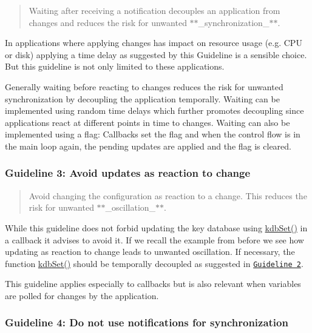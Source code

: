 \begin{quote}
Waiting after receiving a notification decouples an application from changes and reduces the risk for unwanted $\ast$$\ast$\+\_\+synchronization\+\_\+$\ast$$\ast$. \end{quote}


In applications where applying changes has impact on resource usage (e.\+g. C\+PU or disk) applying a time delay as suggested by this Guideline is a sensible choice. But this guideline is not only limited to these applications.

Generally waiting before reacting to changes reduces the risk for unwanted synchronization by decoupling the application temporally. Waiting can be implemented using random time delays which further promotes decoupling since applications react at different points in time to changes. Waiting can also be implemented using a flag\+: Callbacks set the flag and when the control flow is in the main loop again, the pending updates are applied and the flag is cleared.

\subsubsection*{Guideline 3\+: Avoid updates as reaction to change}

\begin{quote}
Avoid changing the configuration as reaction to a change. This reduces the risk for unwanted $\ast$$\ast$\+\_\+oscillation\+\_\+$\ast$$\ast$. \end{quote}


While this guideline does not forbid updating the key database using {\ttfamily \hyperlink{group__kdb_ga11436b058408f83d303ca5e996832bcf}{kdb\+Set()}} in a callback it advises to avoid it. If we recall the example from before we see how updating as reaction to change leads to unwanted oscillation. If necessary, the function {\ttfamily \hyperlink{group__kdb_ga11436b058408f83d303ca5e996832bcf}{kdb\+Set()}} should be temporally decoupled as suggested in \href{#guideline-2-wait-before-reacting-to-changes}{\tt Guideline 2}.

This guideline applies especially to callbacks but is also relevant when variables are polled for changes by the application.

\subsubsection*{Guideline 4\+: Do not use notifications for synchronization}

